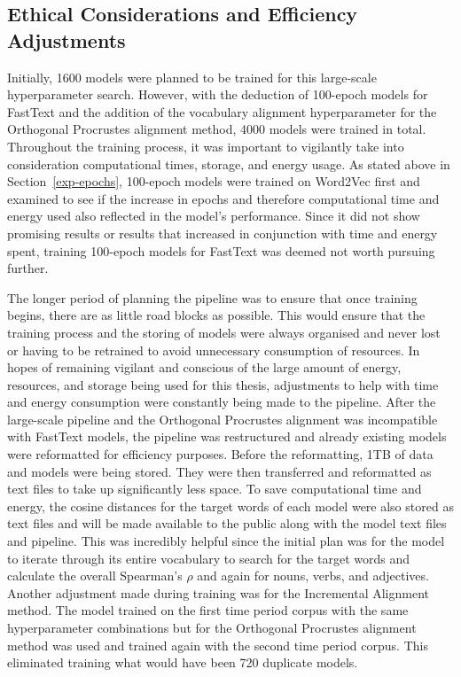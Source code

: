 \subsection{Ethical Considerations and Efficiency Adjustments}
\label{exp-ethics}
Initially, 1600 models were planned to be trained for this large-scale hyperparameter search. However, with the deduction of 100-epoch models for FastText and the addition of the vocabulary alignment hyperparameter for the Orthogonal Procrustes alignment method, 4000 models were trained in total. Throughout the training process, it was important to vigilantly take into consideration computational times, storage, and energy usage. As stated above in Section~\ref{exp-epochs}, 100-epoch models were trained on Word2Vec first and examined to see if the increase in epochs and therefore computational time and energy used also reflected in the model’s performance. Since it did not show promising results or results that increased in conjunction with time and energy spent, training 100-epoch models for FastText was deemed not worth pursuing further. 

The longer period of planning the pipeline was to ensure that once training begins, there are as little road blocks as possible. This would ensure that the training process and the storing of models were always organised and never lost or having to be retrained to avoid unnecessary consumption of resources. In hopes of remaining vigilant and conscious of the large amount of energy, resources, and storage being used for this thesis, adjustments to help with time and energy consumption were constantly being made to the pipeline. After the large-scale pipeline and the Orthogonal Procrustes alignment was incompatible with FastText models, the pipeline was restructured and already existing models were reformatted for efficiency purposes. Before the reformatting, 1TB of data and models were being stored. They were then transferred and reformatted as text files to take up significantly less space. To save computational time and energy, the cosine distances for the target words of each model were also stored as text files and will be made available to the public along with the model text files and pipeline. This was incredibly helpful since the initial plan was for the model to iterate through its entire vocabulary to search for the target words and calculate the overall Spearman’s $\rho$ and again for nouns, verbs, and adjectives. Another adjustment made during training was for the Incremental Alignment method. The model trained on the first time period corpus with the same hyperparameter combinations but for the Orthogonal Procrustes alignment method was used and trained again with the second time period corpus. This eliminated training what would have been 720 duplicate models.  

